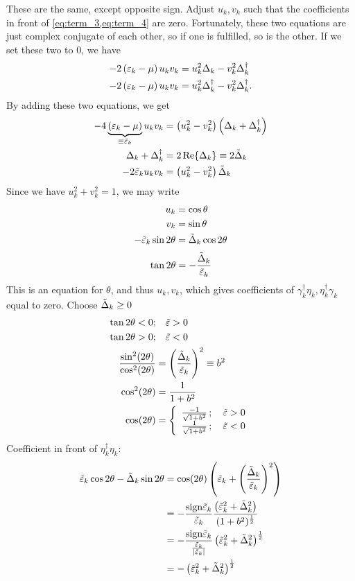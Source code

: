 These are the same, except opposite sign. Adjust $u_k, v_k$ such that the coefficients in front of \cref{eq:term_3,eq:term_4} are zero. Fortunately, these two equations are just complex conjugate of each other, so if one is fulfilled, so is the other.
If we set these two to $0$, we have
\begin{align}
		-2\left(\varepsilon_k - \mu\right)u_kv_k &= u_k^2\Delta_k - v_k^2\Delta_k^\dagger \\
		-2\left(\varepsilon_k - \mu\right)u_kv_k &= u_k^2\Delta_k^\dagger-v_k^2\Delta_k^\dagger.
\end{align}
By adding these two equations, we get
\begin{align*}
-4\underbrace{\left(\varepsilon_k-\mu\right)}_{\equiv\tilde{\varepsilon}_k}u_kv_k &= \left(u_k^2-v_k^2\right)\left(\Delta_k+\Delta_k^\dagger\right) \\
\Delta_k+\Delta_k^\dagger &=  2\Re{\Delta_k} \equiv 2\tilde{\Delta}_k \\
-2\tilde{\varepsilon}_ku_kv_k &= \left(u_k^2-v_k^2\right)\tilde{\Delta}_k
\end{align*}
Since we have $u_k^2+v_k^2 = 1$, we may write 
\begin{align*}
	u_k &= \cos\theta \\
	v_k &=\sin\theta \\
	-\tilde{\varepsilon}_k\sin2\theta &= \tilde{\Delta}_k\cos2\theta 
\end{align*}
\begin{equation}
\label{eq:BCS_theta}
	\tan 2\theta =-\frac{\tilde{\Delta}_k}{\tilde{\varepsilon}_k}
\end{equation}
This is an equation for $\theta$, and thus $u_k, v_k$, which gives coefficients of $\gamma_k^\dagger\eta_k, \eta_k^\dagger\gamma_k$ equal to zero. 
Choose $\tilde{\Delta}_k \ge0$
\begin{align*}
	\tan2\theta <0 ;&\quad \tilde{\varepsilon} >0 \\
	\tan2\theta >0 ;&\quad \tilde{\varepsilon} <0 \\
	\frac{\sin[2](2\theta)}{\cos[2](2\theta)} &= \left(\frac{\tilde{\Delta}_k}{\tilde{\varepsilon}_k}\right)^2 \equiv b^2 \\
	\cos[2](2\theta) &= \frac{1}{1+b^2} \\
	\cos(2\theta) &= \left\{\begin{array}{ll} \frac{-1}{\sqrt{1+b^2}}\, ; \quad \tilde{\varepsilon} >0 \\ \frac{1}{\sqrt{1+b^2}}\, ; \quad \tilde{\varepsilon} <0
	\end{array}\right.
\end{align*}
Coefficient in front of $\eta_k^\dagger\eta_k$:
\begin{align*}
\tilde{\varepsilon}_k\cos2\theta - \tilde{\Delta}_k\sin2\theta &= \cos(2\theta)\left(\tilde{\varepsilon}_k+\left(\frac{\tilde{\Delta}_k}{\tilde{\varepsilon}_k}\right)^2\right) \\
&= -\frac{\text{sign}\tilde{\varepsilon}_k}{\tilde{\varepsilon}_k}\frac{\left(\tilde{\varepsilon}_k^2 + \tilde{\Delta}_k^2\right)}{(1+b^2)^{\frac12}} \\
&= -\frac{\text{sign}\tilde{\varepsilon}_k}{\frac{\tilde{\varepsilon}_k}{|\tilde{\varepsilon}_k|}}\left(\tilde{\varepsilon}_k^2 + \tilde{\Delta}_k^2\right)^\frac12 \\
&= -\left(\tilde{\varepsilon}_k^2 + \tilde{\Delta}_k^2\right)^\frac12
\end{align*}
